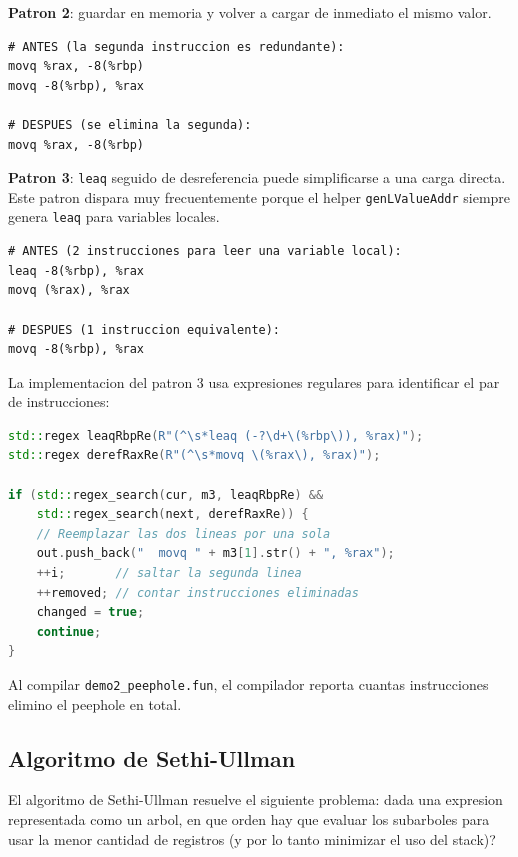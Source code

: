\documentclass[12pt, a4paper]{article}
\begin{document}
\textbf{Patron 2}: guardar en memoria y volver a cargar de inmediato el mismo valor.
\begin{lstlisting}[style=asmstyle, caption={Patron peephole 2: store + reload redundante}]
# ANTES (la segunda instruccion es redundante):
movq %rax, -8(%rbp)
movq -8(%rbp), %rax

# DESPUES (se elimina la segunda):
movq %rax, -8(%rbp)
\end{lstlisting}

\textbf{Patron 3}: \texttt{leaq} seguido de desreferencia puede simplificarse a una carga directa. Este patron dispara muy frecuentemente porque el helper \texttt{genLValueAddr} siempre genera \texttt{leaq} para variables locales.
\begin{lstlisting}[style=asmstyle, caption={Patron peephole 3: leaq + deref colapsado}]
# ANTES (2 instrucciones para leer una variable local):
leaq -8(%rbp), %rax
movq (%rax), %rax

# DESPUES (1 instruccion equivalente):
movq -8(%rbp), %rax
\end{lstlisting}

La implementacion del patron 3 usa expresiones regulares para identificar el par de instrucciones:

\begin{lstlisting}[language=C++, style=cppstyle, caption={Implementacion del patron 3 en el peephole}]
std::regex leaqRbpRe(R"(^\s*leaq (-?\d+\(%rbp\)), %rax)");
std::regex derefRaxRe(R"(^\s*movq \(%rax\), %rax)");

if (std::regex_search(cur, m3, leaqRbpRe) &&
    std::regex_search(next, derefRaxRe)) {
    // Reemplazar las dos lineas por una sola
    out.push_back("  movq " + m3[1].str() + ", %rax");
    ++i;       // saltar la segunda linea
    ++removed; // contar instrucciones eliminadas
    changed = true;
    continue;
}
\end{lstlisting}

Al compilar \texttt{demo2\_peephole.fun}, el compilador reporta cuantas instrucciones elimino el peephole en total.

\subsection{Algoritmo de Sethi-Ullman}

El algoritmo de Sethi-Ullman resuelve el siguiente problema: dada una expresion representada como un arbol, en que orden hay que evaluar los subarboles para usar la menor cantidad de registros (y por lo tanto minimizar el uso del stack)?
\end{document}
